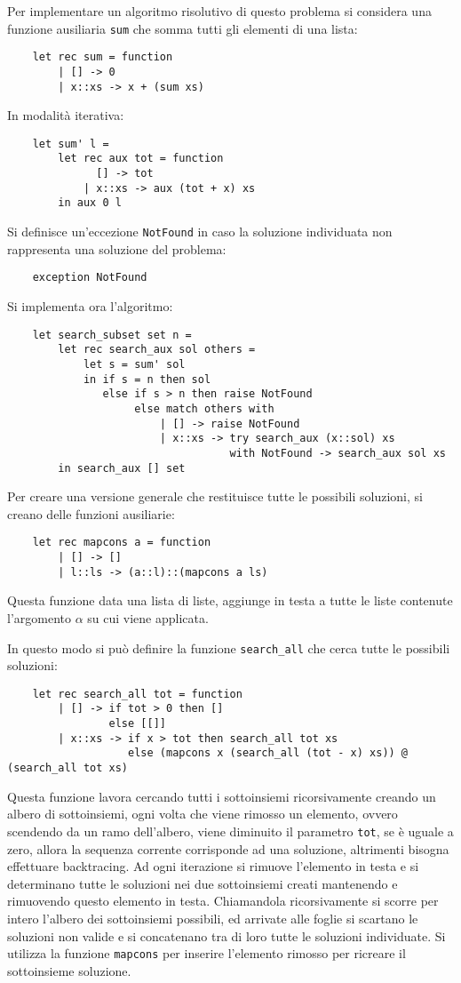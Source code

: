 \documentclass{article}
\numberwithin{equation}{subsection}
\begin{document}
Per implementare un algoritmo risolutivo di questo problema si considera una funzione ausiliaria \verb|sum| che somma tutti gli elementi di una lista:
\begin{verbatim}
    let rec sum = function
        | [] -> 0
        | x::xs -> x + (sum xs)    
\end{verbatim}
In modalità iterativa:
\begin{verbatim}
    let sum' l =
        let rec aux tot = function
              [] -> tot
            | x::xs -> aux (tot + x) xs
        in aux 0 l
\end{verbatim}

Si definisce un'eccezione \verb|NotFound| in caso la soluzione individuata non rappresenta una soluzione del problema:
\begin{verbatim}
    exception NotFound
\end{verbatim}
Si implementa ora l'algoritmo:
\begin{verbatim}
    let search_subset set n = 
        let rec search_aux sol others =
            let s = sum' sol
            in if s = n then sol
               else if s > n then raise NotFound
                    else match others with
                        | [] -> raise NotFound
                        | x::xs -> try search_aux (x::sol) xs
                                   with NotFound -> search_aux sol xs
        in search_aux [] set
\end{verbatim}
Per creare una versione generale che restituisce tutte le possibili soluzioni, si creano delle funzioni ausiliarie:
\begin{verbatim}
    let rec mapcons a = function
        | [] -> []
        | l::ls -> (a::l)::(mapcons a ls)
\end{verbatim}
Questa funzione data una lista di liste, aggiunge in testa a tutte le liste contenute l'argomento $\alpha$ su cui viene applicata. 


In questo modo si può definire la funzione \verb|search_all| che cerca tutte le possibili soluzioni:
\begin{verbatim}
    let rec search_all tot = function
        | [] -> if tot > 0 then []
                else [[]]
        | x::xs -> if x > tot then search_all tot xs
                   else (mapcons x (search_all (tot - x) xs)) @ (search_all tot xs)  
\end{verbatim}
Questa funzione lavora cercando tutti i sottoinsiemi ricorsivamente creando un albero di sottoinsiemi, ogni volta che viene rimosso un elemento, ovvero scendendo da un ramo dell'albero, viene diminuito il parametro \verb|tot|, se è uguale a zero, allora la sequenza corrente corrisponde ad una soluzione, altrimenti bisogna effettuare backtracing. 
Ad ogni iterazione si rimuove l'elemento in testa e si determinano tutte le soluzioni nei due sottoinsiemi creati mantenendo e rimuovendo questo elemento in testa. Chiamandola ricorsivamente si scorre per intero l'albero dei sottoinsiemi possibili, ed arrivate alle foglie si scartano le soluzioni non valide e si concatenano tra di loro tutte le soluzioni individuate. Si utilizza la funzione \verb|mapcons| per inserire l'elemento rimosso per ricreare il sottoinsieme soluzione.  
\end{document}
